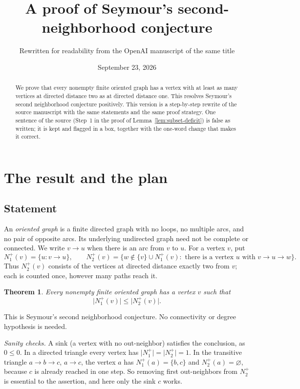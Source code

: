 \documentclass[11pt]{article}
\title{A proof of Seymour's second-neighborhood conjecture}
\author{Rewritten for readability from the OpenAI manuscript of the same title}
\date{September 23, 2026}
\newtheorem{theorem}{Theorem}[section]
\theoremstyle{remark}
\newcommand{\abs}[1]{\lvert #1\rvert}
\begin{document}
\maketitle
\begin{abstract}
We prove that every nonempty finite oriented graph has a vertex with at least
as many vertices at directed distance two as at directed distance one.
This resolves Seymour's second neighborhood conjecture positively.
This version is a step-by-step rewrite of the source manuscript with the same
statements and the same proof strategy.  One sentence of the source (Step~1 in
the proof of Lemma~\ref{lem:subset-deficit}) is false as written; it is kept
and flagged in a box, together with the one-word change that makes it correct.
\end{abstract}

\section{The result and the plan}\label{sec:introduction}

\subsection{Statement}

An \emph{oriented graph} is a finite directed graph with no loops, no multiple
arcs, and no pair of opposite arcs.  Its underlying undirected graph need
not be complete or connected.  We write $v\to u$ when there is an arc from $v$
to $u$.  For a vertex \(v\), put
\[
 N_1^+(v)=\{u:v\to u\},\qquad
 N_2^+(v)=\{w\notin\{v\}\cup N_1^+(v):
                 \text{ there is a vertex }u\text{ with }v\to u\to w\}.
\]
Thus \(N_2^+(v)\) consists of the vertices at directed distance exactly two
from \(v\); each is counted once, however many paths reach it.

\begin{theorem}\label{thm:main}
Every nonempty finite oriented graph has a vertex \(v\) such that
\[
 \abs{N_1^+(v)}\leq \abs{N_2^+(v)}.
\]
\end{theorem}

This is Seymour's second neighborhood conjecture.  No connectivity or degree
hypothesis is needed.

\emph{Sanity checks.}  A sink (a vertex with no out-neighbor) satisfies the
conclusion, as $0\le 0$.  In a directed triangle every vertex has
$\abs{N_1^+}=\abs{N_2^+}=1$.  In the transitive triangle $a\to b\to c$,
$a\to c$, the vertex $a$ has $N_1^+(a)=\{b,c\}$ and $N_2^+(a)=\varnothing$,
because $c$ is already reached in one step.  So removing first out-neighbors
from $N_2^+$ is essential to the assertion, and here only the sink $c$ works.
\end{document}
